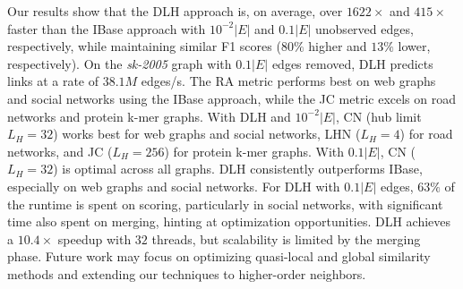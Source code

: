 Our results show that the DLH approach is, on average, over $1622\times$ and $415\times$ faster than the IBase approach with $10^{-2}|E|$ and $0.1|E|$ unobserved edges, respectively, while maintaining similar F1 scores ($80\%$ higher and $13\%$ lower, respectively). On the \textit{sk-2005} graph with $0.1|E|$ edges removed, DLH predicts links at a rate of $38.1M$ edges/s. The RA metric performs best on web graphs and social networks using the IBase approach, while the JC metric excels on road networks and protein k-mer graphs. With DLH and $10^{-2}|E|$, CN (hub limit $L_H = 32$) works best for web graphs and social networks, LHN ($L_H = 4$) for road networks, and JC ($L_H = 256$) for protein k-mer graphs. With $0.1|E|$, CN ($L_H = 32$) is optimal across all graphs. DLH consistently outperforms IBase, especially on web graphs and social networks. For DLH with $0.1|E|$ edges, $63\%$ of the runtime is spent on scoring, particularly in social networks, with significant time also spent on merging, hinting at optimization opportunities. DLH achieves a $10.4\times$ speedup with $32$ threads, but scalability is limited by the merging phase.
%
Future work may focus on optimizing quasi-local and global similarity methods and extending our techniques to higher-order neighbors.
